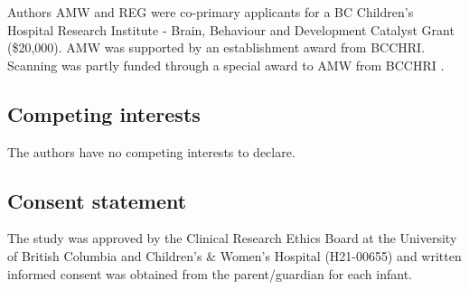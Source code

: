 \documentclass[
true
]{sn-jnl}
\begin{document}
Authors AMW and REG were co-primary applicants for a BC Children's
Hospital Research Institute - Brain, Behaviour and Development Catalyst
Grant (\$20,000). AMW was supported by an establishment award from
BCCHRI. Scanning was partly funded through a special award to AMW from
BCCHRI .

\subsection{Competing interests}\label{competing-interests}

The authors have no competing interests to declare.

\subsection{Consent statement}\label{consent-statement}

The study was approved by the Clinical Research Ethics Board at the
University of British Columbia and Children's \& Women's Hospital
(H21-00655) and written informed consent was obtained from the
parent/guardian for each infant.
\end{document}
